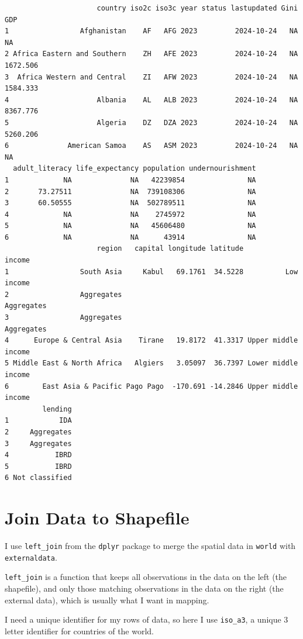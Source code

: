 \documentclass[
  letterpaper,
  DIV=11,
  numbers=noendperiod,
  oneside]{scrreprt}
\begin{document}
\begin{verbatim}
                      country iso2c iso3c year status lastupdated Gini      GDP
1                 Afghanistan    AF   AFG 2023         2024-10-24   NA       NA
2 Africa Eastern and Southern    ZH   AFE 2023         2024-10-24   NA 1672.506
3  Africa Western and Central    ZI   AFW 2023         2024-10-24   NA 1584.333
4                     Albania    AL   ALB 2023         2024-10-24   NA 8367.776
5                     Algeria    DZ   DZA 2023         2024-10-24   NA 5260.206
6              American Samoa    AS   ASM 2023         2024-10-24   NA       NA
  adult_literacy life_expectancy population undernourishment
1             NA              NA   42239854               NA
2       73.27511              NA  739108306               NA
3       60.50555              NA  502789511               NA
4             NA              NA    2745972               NA
5             NA              NA   45606480               NA
6             NA              NA      43914               NA
                      region   capital longitude latitude              income
1                 South Asia     Kabul   69.1761  34.5228          Low income
2                 Aggregates                                       Aggregates
3                 Aggregates                                       Aggregates
4      Europe & Central Asia    Tirane   19.8172  41.3317 Upper middle income
5 Middle East & North Africa   Algiers   3.05097  36.7397 Lower middle income
6        East Asia & Pacific Pago Pago  -170.691 -14.2846 Upper middle income
         lending
1            IDA
2     Aggregates
3     Aggregates
4           IBRD
5           IBRD
6 Not classified
\end{verbatim}

\section{Join Data to Shapefile}\label{join-data-to-shapefile}

I use \texttt{left\_join} from the \texttt{dplyr} package to merge the
spatial data in \texttt{world} with \texttt{externaldata}.

\texttt{left\_join} is a function that keeps all observations in the
data on the left (the shapefile), and only those matching observations
in the data on the right (the external data), which is usually what I
want in mapping.

I need a unique identifier for my rows of data, so here I use
\texttt{iso\_a3}, a unique 3 letter identifier for countries of the
world.
\end{document}
